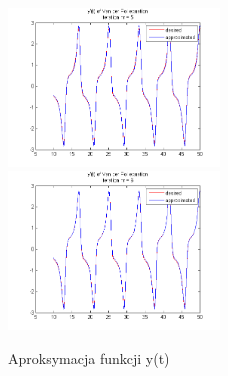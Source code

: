 \begin{figure}[ht!]
	\subfloat
	{\includegraphics[width=0.5\textwidth]
	{images/deriv_iter5.png}}
	\subfloat
	{\includegraphics[width=0.5\textwidth]
	{images/deriv_iter6.png}}	
	
	\caption{Aproksymacja funkcji y(t)}		
	\label{fig:aproksymacja_x1}
\end{figure}


